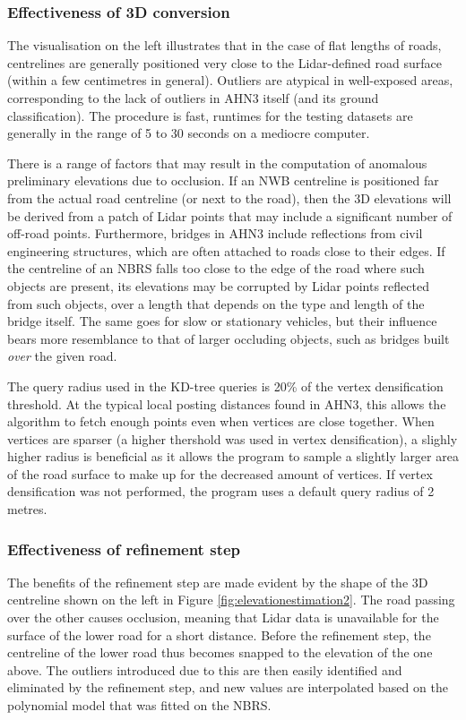 \subsubsection{Effectiveness of 3D conversion}

The visualisation on the left illustrates that in the case of flat lengths of roads, centrelines are generally positioned very close to the Lidar-defined road surface (within a few centimetres in general). Outliers are atypical in well-exposed areas, corresponding to the lack of outliers in AHN3 itself (and its ground classification). The procedure is fast, runtimes for the testing datasets are generally in the range of 5 to 30 seconds on a mediocre computer.

There is a range of factors that may result in the computation of anomalous preliminary elevations due to occlusion. If an NWB centreline is positioned far from the actual road centreline (or next to the road), then the 3D elevations will be derived from a patch of Lidar points that may include a significant number of off-road points. Furthermore, bridges in AHN3 include reflections from civil engineering structures, which are often attached to roads close to their edges. If the centreline of an NBRS falls too close to the edge of the road where such objects are present, its elevations may be corrupted by Lidar points reflected from such objects, over a length that depends on the type and length of the bridge itself. The same goes for slow or stationary vehicles, but their influence bears more resemblance to that of larger occluding objects, such as bridges built \textit{over} the given road.

The query radius used in the KD-tree queries is 20\% of the vertex densification threshold. At the typical local posting distances found in AHN3, this allows the algorithm to fetch enough points even when vertices are close together. When vertices are sparser (a higher thershold was used in vertex densification), a slighly higher radius is beneficial as it allows the program to sample a slightly larger area of the road surface to make up for the decreased amount of vertices. If vertex densification was not performed, the program uses a default query radius of 2 metres.

\subsubsection{Effectiveness of refinement step}

The benefits of the refinement step are made evident by the shape of the 3D centreline shown on the left in Figure \ref{fig:elevationestimation2}. The road passing over the other causes occlusion, meaning that Lidar data is unavailable for the surface of the lower road for a short distance. Before the refinement step, the centreline of the lower road thus becomes snapped to the elevation of the one above. The outliers introduced due to this are then easily identified and eliminated by the refinement step, and new values are interpolated based on the polynomial model that was fitted on the NBRS.


